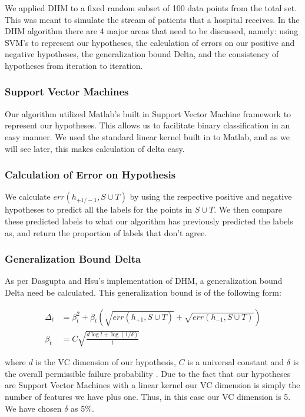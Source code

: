 \documentclass[12pt]{article}
\begin{document}
We applied DHM to a fixed random subset of 100 data points from the total set. This was meant to simulate the stream of patients that a hospital receives. In the DHM algorithm there are 4 major areas that need to be discussed, namely: using SVM's to represent our hypotheses, the calculation of errors on our positive and negative hypotheses, the generalization bound Delta, and the consistency of hypotheses from iteration to iteration.

\subsubsection{Support Vector Machines}
Our algorithm utilized Matlab's built in Support Vector Machine framework to represent our hypotheses. This allows us to facilitate binary classification in an easy manner. We used the standard linear kernel built in to Matlab, and as we will see later, this makes calculation of delta easy.

\subsubsection{Calculation of Error on Hypothesis}
We calculate $err(h_{+1/-1},S\cup T)$ by using the respective positive and negative hypotheses to predict all the labels for the points in $S\cup T$. We then compare these predicted labels to what our algorithm has previously predicted the labels as, and return the proportion of labels that don't agree.

\subsubsection{Generalization Bound Delta}
As per Dasgupta and Hsu's implementation of DHM, a generalization bound Delta need be calculated. This generalization bound is of the following form:

\begin{align*}
\Delta_t &= \beta_t^2+\beta_t(\sqrt{err(h_{+1},S\cup T)}+\sqrt{err(h_{-1}, S\cup T)})\\
\beta_t&= C\sqrt{\frac{d \log t + \log(1/\delta)}{t}}
\end{align*}

where $d$ is the VC dimension of our hypothesis, $C$ is a universal constant and $\delta$ is the overall permissible failure probability \cite{DH}. Due to the fact that our hypotheses are Support Vector Machines with a linear kernel our VC dimension is simply the number of features we have plus one. Thus, in this case our VC dimension is 5. We have chosen $\delta$ as 5\%. 
\end{document}
